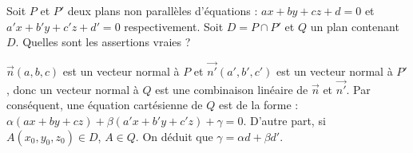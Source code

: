 \begin{question} 

Soit $P$ et $P'$ deux plans non parallèles d'équations :  $ax+by+cz+d =0$ et $a'x+b'y+c'z+d' =0$ respectivement. Soit $D=P\cap P'$ et $Q$ un plan contenant $D$. Quelles sont les assertions vraies ?
\begin{answers}
     
   
     
 
    
\end{answers}
\begin{explanations}
$\vec{n}(a,b,c)$ est un vecteur normal à $P$ et $\vec{n'}(a',b',c')$ est un vecteur normal à $P'$, donc un vecteur normal à $Q$ est une combinaison linéaire de $\vec{n}$ et $\vec{n'}$. Par conséquent, une équation cartésienne de $Q$ est de la forme :  $\alpha(ax+by+cz)+\beta(a'x+b'y+c'z) + \gamma =0.$ D'autre part, si $A(x_0,y_0,z_0) \in D$, $A \in Q$. On déduit que $\gamma = \alpha d + \beta d'$.
\end{explanations}

\end{question}
 
 
 
 
 
